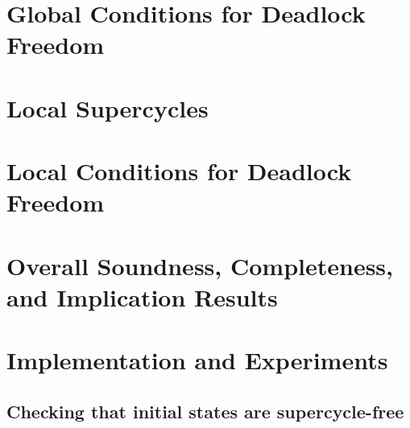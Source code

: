 \documentclass[prodmode,acmtosem]{acmsmall} %
\begin{document}
\section{Global Conditions for Deadlock Freedom}
\label{secn:globalDeadlockFreedom}
\label{s:global}



\section{Local Supercycles}
\label{secn:localSupercycles}



\section{Local Conditions for Deadlock Freedom}
\label{secn:localDeadlockFreedom}
\label{s:local}



\section{Overall Soundness, Completeness, and Implication Results}

\label{s:results}



\section{Implementation and Experiments}
\label{s:impl}

   \subsection{Checking that initial states are supercycle-free}
   \label{s:initSCFree}
   
\end{document}
